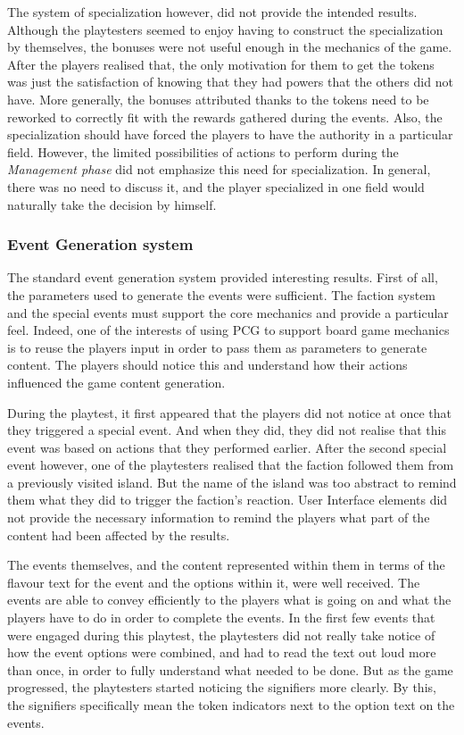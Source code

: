 The system of specialization however, did not provide the intended results. Although the playtesters seemed to enjoy having to construct the specialization by themselves, the bonuses were not useful enough in the mechanics of the game. After the players realised that, the only motivation for them to get the tokens was just the satisfaction of knowing that they had powers that the others did not have. More generally, the bonuses attributed thanks to the tokens need to be reworked to correctly fit with the rewards gathered during the events. Also, the specialization should have forced the players to have the authority in a particular field. However, the limited possibilities of actions to perform during the \textit{Management phase} did not emphasize this need for specialization. In general, there was no need to discuss it, and the player specialized in one field would naturally take the decision by himself.

\subsubsection{Event Generation system}
The standard event generation system provided interesting results. First of all, the parameters used to generate the events were sufficient.
The faction system and the special events must support the core mechanics and provide a particular feel. Indeed, one of the interests of using PCG to support board game mechanics is to reuse the players input in order to pass them as parameters to generate content. The players should notice this and understand how their actions influenced the game content generation. 

During the playtest, it first appeared that the players did not notice at once that they triggered a special event. And when they did, they did not realise that this event was based on actions that they performed earlier. After the second special event however, one of the playtesters realised that the faction followed them from a previously visited island. But the name of the island was too abstract to remind them what they did to trigger the faction's reaction. User Interface elements did not provide the necessary information to remind the players what part of the content had been affected by the results. 

The events themselves, and the content represented within them in terms of the flavour text for the event and the options within it, were well received. The events are able to convey efficiently to the players what is going on and what the players have to do in order to complete the events. 
In the first few events that were engaged during this playtest, the playtesters did not really take notice of how the event options were combined, and had to read the text out loud more than once, in order to fully understand what needed to be done. But as the game progressed, the playtesters started noticing the signifiers more clearly. By this, the signifiers specifically mean the token indicators next to the option text on the events.


